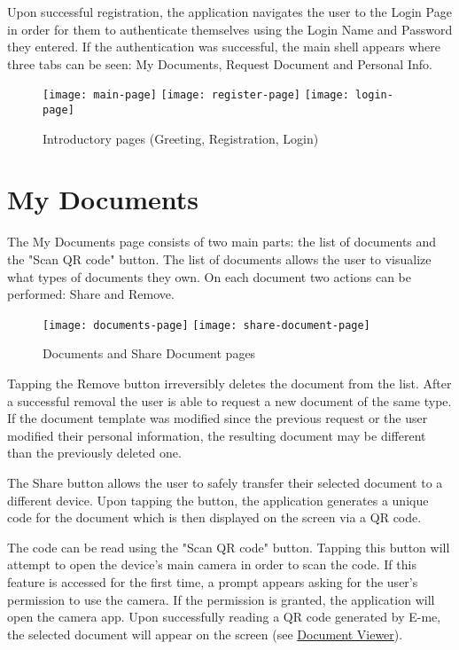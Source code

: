 		Upon successful registration, the application navigates the user to the Login Page in order for them to authenticate themselves using the Login Name and Password they entered.
		If the authentication was successful, the main shell appears where three tabs can be seen: My Documents, Request Document and Personal Info.

		\begin{figure}[h]
			\centering
			\texttt{[image: main-page]}				
			\texttt{[image: register-page]}			
			\texttt{[image: login-page]}				
			\caption{Introductory pages (Greeting, Registration, Login)}
		\end{figure}

	\section{My Documents}\label{documents}
	The My Documents page consists of two main parts: the list of documents and the "Scan QR code" button.
	The list of documents allows the user to visualize what types of documents they own.
	On each document two actions can be performed: Share and Remove.

		\begin{figure}[h]
			\centering
			\texttt{[image: documents-page]}				
			\texttt{[image: share-document-page]}
			\caption{Documents and Share Document pages}
		\end{figure}

		Tapping the Remove button irreversibly deletes the document from the list.
		After a successful removal the user is able to request a new document of the same type.
		If the document template was modified since
		the previous request or the user modified their personal information, the resulting document may be different than the previously deleted one.

		The Share button allows the user to safely transfer their selected document to a different device.
		Upon tapping the button, the application generates a unique code for the document which is then displayed on the screen via a QR code.

		The code can be read using the "Scan QR code" button. 
		Tapping this button will attempt to open the device's main camera in order to scan the code.
		If this feature is accessed for the first time, a prompt appears asking for the user's permission to use the camera.
		If the permission is granted, the application will open the camera app. 
		Upon successfully reading a QR code generated by E-me, the selected document will appear on the screen (see \hyperref[document]{Document Viewer}).

